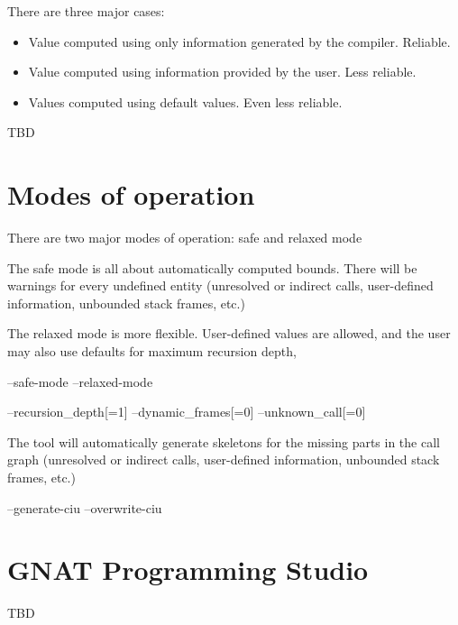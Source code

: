 There are three major cases:

\begin{itemize}

\item Value computed using only information generated by the
  compiler. Reliable.

\item Value computed using information provided by the user. Less reliable.

\item Values computed using default values. Even less reliable.

\end{itemize}

TBD

\section{Modes of operation}

There are two major modes of operation: safe and relaxed mode

The safe mode is all about automatically computed bounds. There will
be warnings for every undefined entity (unresolved or indirect calls,
user-defined information, unbounded stack frames, etc.)

The relaxed mode is more flexible. User-defined values are allowed,
and the user may also use defaults for maximum recursion depth, 

   --safe-mode
   --relaxed-mode

   --recursion\_depth[=1]
   --dynamic\_frames[=0]
   --unknown\_call[=0]

The tool will automatically generate skeletons for the missing parts
in the call graph (unresolved or indirect calls, user-defined
information, unbounded stack frames, etc.)

   --generate-ciu
   --overwrite-ciu

\section{GNAT Programming Studio}

TBD
